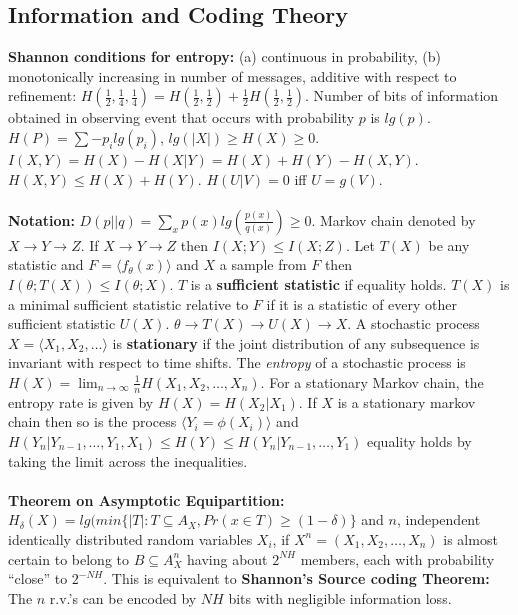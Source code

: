 \subsection{Information and Coding Theory}
{\bf Shannon conditions for entropy:} (a) continuous in probability,
(b) monotonically increasing in
number of messages, additive with respect to refinement:
$H(\frac {1} {2}, \frac {1} {4}, \frac {1} {4})=
H(\frac {1} {2}, \frac {1} {2} ) +
\frac {1} {2} H(\frac {1} {2}, \frac {1} {2})$.
Number of bits of information obtained in observing event that occurs
with probability $p$ is $lg(p)$.
$H(P) = \sum - p_{i} lg ( p_{i})$, $lg(|X|) \ge H(X) \ge 0$.
$I(X, Y)= H(X)-H(X | Y )= H(X)+H(Y)-H(X,Y)$.
$H(X,Y) \leq H(X) + H(Y)$.  $H(U|V)= 0$ iff $U=g(V)$.
\\
\\
{\bf Notation:}
$D(p||q)= \sum_x p(x) lg({\frac {p(x)} {q(x)}}) \ge 0$.  Markov chain
denoted by $X \rightarrow Y \rightarrow Z$.
If $X \rightarrow Y \rightarrow Z$ then $I(X;Y) \le I(X;Z)$.  Let $T(X)$ be
any statistic and $F= \langle f_{\theta}(x) \rangle$ and $X$ a sample from $F$ then
$I(\theta; T(X)) \le I(\theta; X)$.  $T$ is a {\bf sufficient statistic} if equality
holds.  $T(X)$ is a minimal sufficient statistic relative to $F$ if
it is a statistic of every other sufficient statistic $U(X)$.
$\theta \rightarrow T(X) \rightarrow U(X) \rightarrow X$.  A stochastic
process $X= \langle X_1 , X_2 , \ldots \rangle$ is {\bf stationary} if the
joint distribution of any subsequence is invariant with respect to time shifts.
The \emph{entropy} of a stochastic process is 
$H(X)= \lim_{n \rightarrow \infty} {\frac 1 n} H(X_1 , X_2 , \ldots , X_n)$.  For
a stationary Markov chain, the entropy rate is given by $H(X)= H(X_2 | X_1)$.
If $X$ is a stationary markov chain then so is the process 
$\langle Y_i= \phi(X_i) \rangle$ and 
$ H(Y_n | Y_{n-1}, \ldots, Y_1, X_1) \le H(Y) \le H(Y_n | Y_{n-1}, \ldots, Y_1)$
equality holds by taking the limit across the inequalities.
\\
\\
{\bf Theorem on Asymptotic Equipartition:} 
$H_{\delta}(X)= lg( min \{ |T|: T \subseteq A_X, Pr(x \in T ) \geq (1- \delta ) \}$
and $n$, independent identically distributed random variables $X_i$,
if $X^{n}=(X_1 , X_2 , \ldots , X_n )$ is almost certain to belong to
$B \subseteq A^{n}_X $ having about $2^{NH}$ members, each with
probability ``close'' to $2^{-NH}$.  This is equivalent to 
{\bf Shannon's Source coding Theorem:} 
The $n$ r.v.'s can be encoded by $NH$ bits with negligible
information loss.
